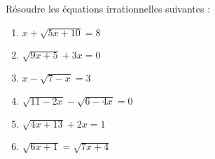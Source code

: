\begin{exercice}
Résoudre les équations irrationnelles suivantes :
\begin{multicols}{2}
\begin{enumerate}
\item $x+\sqrt{5x+10}=8$
\item $\sqrt{9x+5}+3x=0$
\item $x-\sqrt{7-x}=3$
\item $\sqrt{11-2x}-\sqrt{6-4x}=0$
\item $\sqrt{4x+13}+2x=1$
\item $\sqrt{6x+1}=\sqrt{7x+4}$
\end{enumerate}
\end{multicols}
\end{exercice}